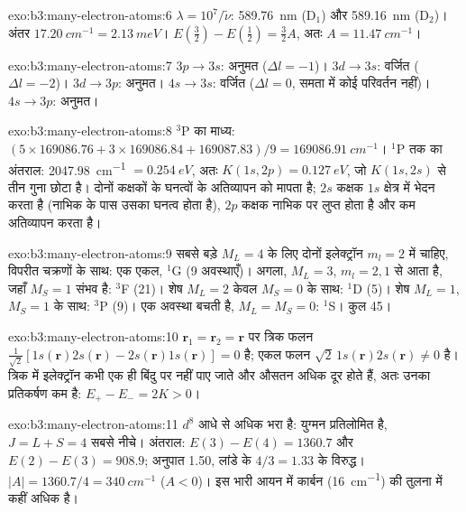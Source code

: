 \begin{solution}{exo:b3:many-electron-atoms:6}
$\lambda = 10^7/\tilde\nu$: \qty{589.76}{nm} (D$_1$) और \qty{589.16}{nm}
(D$_2$)। अंतर $\qty{17.20}{cm^{-1}} = \qty{2.13}{meV}$। $E(\frac32) -
E(\frac12) = \frac32A$, अतः $A = \qty{11.47}{cm^{-1}}$।
\end{solution}

\begin{solution}{exo:b3:many-electron-atoms:7}
$3p \to 3s$: अनुमत ($\Delta l = -1$)। $3d \to 3s$: वर्जित ($\Delta l = -2$)।
$3d \to 3p$: अनुमत। $4s \to 3s$: वर्जित ($\Delta l = 0$, समता में कोई
परिवर्तन नहीं)। $4s \to 3p$: अनुमत।
\end{solution}

\begin{solution}{exo:b3:many-electron-atoms:8}
${}^3$P का माध्य: $(5 \times 169086.76 + 3 \times 169086.84 + 169087.83)/9 =
\qty{169086.91}{cm^{-1}}$। ${}^1$P तक का अंतराल: \qty{2047.98}{cm^{-1}} $=
\qty{0.254}{eV}$, अतः $K(1s,2p) = \qty{0.127}{eV}$, जो
$K(1s,2s)$ से तीन गुना छोटा है।  दोनों कक्षकों के घनत्वों के
अतिव्यापन को मापता है; $2s$ कक्षक $1s$ क्षेत्र में भेदन करता है (नाभिक के पास
उसका घनत्व होता है), $2p$ कक्षक नाभिक पर लुप्त होता है और कम अतिव्यापन करता है।
\end{solution}

\begin{solution}{exo:b3:many-electron-atoms:9}
सबसे बड़े $M_L = 4$ के लिए दोनों इलेक्ट्रॉन $m_l = 2$ में चाहिए, विपरीत चक्रणों के साथ: एक
एकल, ${}^1$G (9 अवस्थाएँ)। अगला, $M_L = 3$, $m_l = 2, 1$ से आता है, जहाँ
$M_S = 1$ संभव है: ${}^3$F (21)। शेष $M_L = 2$ केवल $M_S = 0$ के साथ:
${}^1$D (5)। शेष $M_L = 1$, $M_S = 1$ के साथ: ${}^3$P (9)। एक अवस्था बचती है,
$M_L = M_S = 0$: ${}^1$S। कुल 45।
\end{solution}

\begin{solution}{exo:b3:many-electron-atoms:10}
$\mathbf r_1 = \mathbf r_2 = \mathbf r$ पर त्रिक फलन
$\frac{1}{\sqrt2}[1s(\mathbf r)2s(\mathbf r) - 2s(\mathbf r)1s(\mathbf r)] = 0$ है;
एकल फलन $\sqrt2\,1s(\mathbf r)2s(\mathbf r) \ne 0$ है। त्रिक में
इलेक्ट्रॉन कभी एक ही बिंदु पर नहीं पाए जाते और औसतन अधिक दूर
होते हैं, अतः उनका प्रतिकर्षण कम है: $E_+ - E_- = 2K > 0$।
\end{solution}

\begin{solution}{exo:b3:many-electron-atoms:11}
$d^8$ आधे से अधिक भरा है: युग्मन प्रतिलोमित है, $J = L + S = 4$
सबसे नीचे। अंतराल: $E(3) - E(4) = 1360.7$ और $E(2) - E(3) = 908.9$; अनुपात
1.50, लांडे के $4/3 = 1.33$ के विरुद्ध। $|A| = 1360.7/4 = \qty{340}{cm^{-1}}$
($A < 0$)। इस भारी आयन में  कार्बन
(\qty{16}{cm^{-1}}) की तुलना में कहीं अधिक है।
\end{solution}

